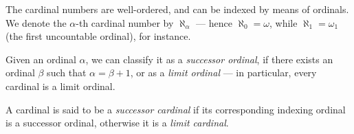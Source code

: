 The cardinal numbers are well-ordered, and can be indexed by means of
ordinals. We denote the \(\alpha\)-th cardinal number by \(\aleph_{\alpha}\) ---
hence \(\aleph_0 = \omega\), while \(\aleph_1 = \omega_1\) (the first
uncountable ordinal), for instance.

\begin{definition}
\label{def:successor-limit-ordinal}
Given an ordinal \(\alpha\), we can classify it as a \emph{successor ordinal},
if there exists an ordinal \(\beta\) such that \(\alpha = \beta + 1\), or as a
\emph{limit ordinal} --- in particular, every cardinal is a limit ordinal.
\end{definition}

\begin{definition}
\label{def:successor-limit-cardinal}
A cardinal is said to be a \emph{successor cardinal} if its corresponding
indexing ordinal is a successor ordinal, otherwise it is a \emph{limit
cardinal}.
\end{definition}


